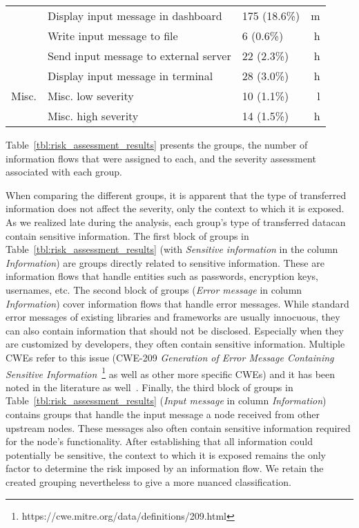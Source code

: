 \begin{table}
\begin{tabular}{p{2.1cm}p{7.1cm}p{1.8cm}r}
         & Display input message in dashboard & 175 (18.6\%) & m \\
         & Write input message to file & 6 (0.6\%) & h \\
         & Send input message to external server & 22 (2.3\%) & h\\
         & Display input message in terminal & 28 (3.0\%) & h \\
        \midrule
        Misc. & Misc. low severity & 10 (1.1\%) & l \\
         & Misc. high severity & 14 (1.5\%) & h \\
        \bottomrule
    \end{tabular}
\end{table}
%
%
%
Table~\ref{tbl:risk_assessment_results} presents the groups, the number of information flows that were assigned to each, and the severity assessment associated with each group.

When comparing the different groups, it is apparent that the type of transferred information does not affect the severity, only the context to which it is exposed.
As we realized late during the analysis, each group's type of transferred datacan contain sensitive information.
The first block of groups in Table~\ref{tbl:risk_assessment_results} (with \textit{Sensitive information} in the column \textit{Information}) are groups directly related to sensitive information.
These are information flows that handle entities such as passwords, encryption keys, usernames, etc.
The second block of groups (\textit{Error message} in column \textit{Information}) cover information flows that handle error messages.
While standard error messages of existing libraries and frameworks are usually innocuous, they can also contain information that should not be disclosed.
Especially when they are customized by developers, they often contain sensitive information.
Multiple CWEs refer to this issue (CWE-209 \textit{Generation of Error Message Containing Sensitive Information}~\footnote{https://cwe.mitre.org/data/definitions/209.html} as well as other more specific CWEs) and it has been noted in the literature as well~\cite{Halfond06_error_messages,Smith10_error_messages}.
Finally, the third block of groups in Table~\ref{tbl:risk_assessment_results} (\textit{Input message} in column \textit{Information}) contains groups that handle the input message a node received from other upstream nodes.
These messages also often contain sensitive information required for the node's functionality.
After establishing that all information could potentially be sensitive, the context to which it is exposed remains the only factor to determine the risk imposed by an information flow.
We retain the created grouping nevertheless to give a more nuanced classification.

